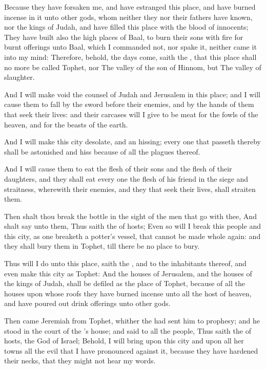 \verse Because they have forsaken me, and have estranged this place, and have burned incense in it unto other gods, whom neither they nor their fathers have known, nor the kings of Judah, and have filled this place with the blood of innocents; \verse They have built also the high places of Baal, to burn their sons with fire for burnt offerings unto Baal, which I commanded not, nor spake it, neither came it into my mind: \verse Therefore, behold, the days come, saith the \LORD, that this place shall no more be called Tophet, nor The valley of the son of Hinnom, but The valley of slaughter.

\verse And I will make void the counsel of Judah and Jerusalem in this place; and I will cause them to fall by the sword before their enemies, and by the hands of them that seek their lives: and their carcases will I give to be meat for the fowls of the heaven, and for the beasts of the earth.

\verse And I will make this city desolate, and an hissing; every one that passeth thereby shall be astonished and hiss because of all the plagues thereof.

\verse And I will cause them to eat the flesh of their sons and the flesh of their daughters, and they shall eat every one the flesh of his friend in the siege and straitness, wherewith their enemies, and they that seek their lives, shall straiten them.

\verse Then shalt thou break the bottle in the sight of the men that go with thee, \verse And shalt say unto them, Thus saith the \LORD of hosts; Even so will I break this people and this city, as one breaketh a potter's vessel, that cannot be made whole again: and they shall bury them in Tophet, till there be no place to bury.

\verse Thus will I do unto this place, saith the \LORD, and to the inhabitants thereof, and even make this city as Tophet: \verse And the houses of Jerusalem, and the houses of the kings of Judah, shall be defiled as the place of Tophet, because of all the houses upon whose roofs they have burned incense unto all the host of heaven, and have poured out drink offerings unto other gods.

\verse Then came Jeremiah from Tophet, whither the \LORD had sent him to prophesy; and he stood in the court of the \LORD's house; and said to all the people, \verse Thus saith the \LORD of hosts, the God of Israel; Behold, I will bring upon this city and upon all her towns all the evil that I have pronounced against it, because they have hardened their necks, that they might not hear my words.


